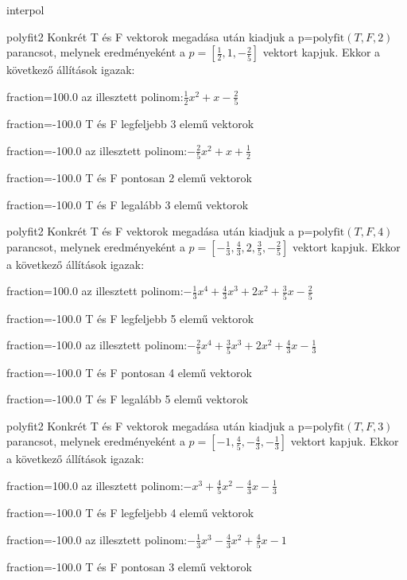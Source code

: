 \documentclass[12pt]{article}
\begin{document}
\begin{quiz}{interpol}
\begin{multi}[multiple]{polyfit2}
Konkrét T és F vektorok megadása után kiadjuk a p=$\mathrm{polyfit}(T,F,2)$
parancsot, melynek eredményeként a $p=\left[\frac{1}{2},1,-\frac{2}{5}\right]$ vektort kapjuk.
Ekkor a következő állítások igazak:
\item[fraction=100.0] az illesztett polinom:$\frac{1}{2}x^2+x-\frac{2}{5}$
\item[fraction=-100.0]  T és F legfeljebb 3 elemű vektorok
\item[fraction=-100.0]  az illesztett polinom:$-\frac{2}{5}x^2+x+\frac{1}{2}$
\item[fraction=-100.0]  T és F pontosan 2 elemű vektorok
\item[fraction=-100.0] T és F legalább 3 elemű vektorok
\end{multi}
\begin{multi}[multiple]{polyfit2}
Konkrét T és F vektorok megadása után kiadjuk a p=$\mathrm{polyfit}(T,F,4)$
parancsot, melynek eredményeként a $p=\left[-\frac{1}{3},\frac{4}{3},2,\frac{3}{5},-\frac{2}{5}\right]$ vektort kapjuk.
Ekkor a következő állítások igazak:
\item[fraction=100.0] az illesztett polinom:$-\frac{1}{3}x^4+\frac{4}{3}x^3+2x^2+\frac{3}{5}x-\frac{2}{5}$
\item[fraction=-100.0]  T és F legfeljebb 5 elemű vektorok
\item[fraction=-100.0]  az illesztett polinom:$-\frac{2}{5}x^4+\frac{3}{5}x^3+2x^2+\frac{4}{3}x-\frac{1}{3}$
\item[fraction=-100.0]  T és F pontosan 4 elemű vektorok
\item[fraction=-100.0] T és F legalább 5 elemű vektorok
\end{multi}
\begin{multi}[multiple]{polyfit2}
Konkrét T és F vektorok megadása után kiadjuk a p=$\mathrm{polyfit}(T,F,3)$
parancsot, melynek eredményeként a $p=\left[-1,\frac{4}{5},-\frac{4}{3},-\frac{1}{3}\right]$ vektort kapjuk.
Ekkor a következő állítások igazak:
\item[fraction=100.0] az illesztett polinom:$-x^3+\frac{4}{5}x^2-\frac{4}{3}x-\frac{1}{3}$
\item[fraction=-100.0]  T és F legfeljebb 4 elemű vektorok
\item[fraction=-100.0]  az illesztett polinom:$-\frac{1}{3}x^3-\frac{4}{3}x^2+\frac{4}{5}x-1$
\item[fraction=-100.0]  T és F pontosan 3 elemű vektorok

\end{multi}
\end{quiz}
\end{document}
